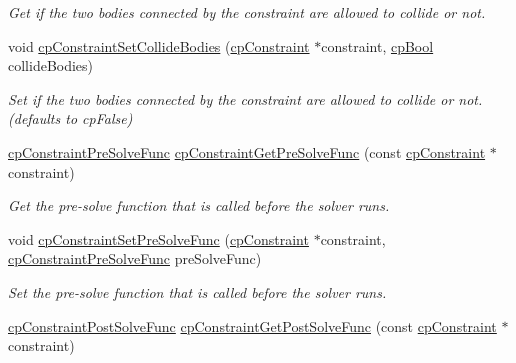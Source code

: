 \begin{DoxyCompactItemize}
\begin{DoxyCompactList}\small\item\em Get if the two bodies connected by the constraint are allowed to collide or not. \end{DoxyCompactList}\item 
\hypertarget{group__cp_constraint_ga25ca6ba57bc60cf1b78bf0d38e577ef5}{}void \hyperlink{group__cp_constraint_ga25ca6ba57bc60cf1b78bf0d38e577ef5}{cp\+Constraint\+Set\+Collide\+Bodies} (\hyperlink{structcp_constraint}{cp\+Constraint} $\ast$constraint, \hyperlink{group__basic_types_gabc5e752c48f3449ca26ef413ecbd647e}{cp\+Bool} collide\+Bodies)\label{group__cp_constraint_ga25ca6ba57bc60cf1b78bf0d38e577ef5}

\begin{DoxyCompactList}\small\item\em Set if the two bodies connected by the constraint are allowed to collide or not. (defaults to cp\+False) \end{DoxyCompactList}\item 
\hypertarget{group__cp_constraint_gac38df5b06f2b7ae92bc420cd9c37397f}{}\hyperlink{group__cp_constraint_gaf6038a155d58f45d6ab977dd1b1398de}{cp\+Constraint\+Pre\+Solve\+Func} \hyperlink{group__cp_constraint_gac38df5b06f2b7ae92bc420cd9c37397f}{cp\+Constraint\+Get\+Pre\+Solve\+Func} (const \hyperlink{structcp_constraint}{cp\+Constraint} $\ast$constraint)\label{group__cp_constraint_gac38df5b06f2b7ae92bc420cd9c37397f}

\begin{DoxyCompactList}\small\item\em Get the pre-\/solve function that is called before the solver runs. \end{DoxyCompactList}\item 
\hypertarget{group__cp_constraint_ga2710c481dba8d81702f84b7253ff5f4f}{}void \hyperlink{group__cp_constraint_ga2710c481dba8d81702f84b7253ff5f4f}{cp\+Constraint\+Set\+Pre\+Solve\+Func} (\hyperlink{structcp_constraint}{cp\+Constraint} $\ast$constraint, \hyperlink{group__cp_constraint_gaf6038a155d58f45d6ab977dd1b1398de}{cp\+Constraint\+Pre\+Solve\+Func} pre\+Solve\+Func)\label{group__cp_constraint_ga2710c481dba8d81702f84b7253ff5f4f}

\begin{DoxyCompactList}\small\item\em Set the pre-\/solve function that is called before the solver runs. \end{DoxyCompactList}\item 
\hypertarget{group__cp_constraint_ga24419dea28768dcb41696ebd17f40124}{}\hyperlink{group__cp_constraint_ga2208378297a7265d0cc69f31697961b9}{cp\+Constraint\+Post\+Solve\+Func} \hyperlink{group__cp_constraint_ga24419dea28768dcb41696ebd17f40124}{cp\+Constraint\+Get\+Post\+Solve\+Func} (const \hyperlink{structcp_constraint}{cp\+Constraint} $\ast$constraint)\label{group__cp_constraint_ga24419dea28768dcb41696ebd17f40124}


\end{DoxyCompactItemize}
